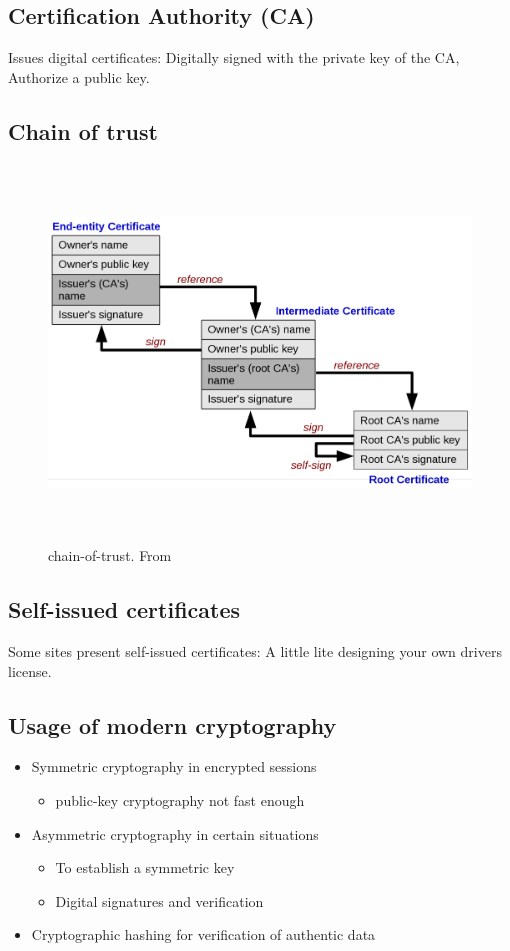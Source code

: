 \subsection{Certification Authority (CA)}
Issues digital certificates: Digitally signed with the private key of the CA,
Authorize a public key.

\subsection{Chain of trust}
\begin{figure}[h]
    \vspace{10mm}
    \centering
    \includegraphics[width=16cm, height=10cm]{image/chain-of-trust.png}
    \caption{chain-of-trust. From \cite{}}
\end{figure}

\subsection{Self-issued certificates}
Some sites present self-issued certificates: A little lite designing your own drivers license.

\subsection{Usage of modern cryptography}
\begin{itemize}
\item Symmetric cryptography in encrypted sessions
  \begin{itemize}
    \item public-key cryptography not fast enough
  \end{itemize}
\item Asymmetric cryptography in certain situations
  \begin{itemize}
  \item To establish a symmetric key
  \item Digital signatures and verification
  \end{itemize}
\item Cryptographic hashing for verification of authentic data
\end{itemize}


